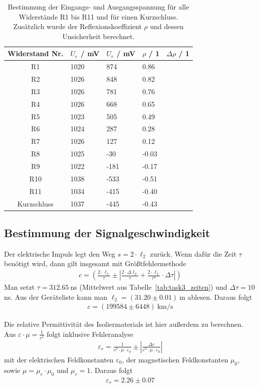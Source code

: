 \documentclass{article}
\begin{document}
\begin{table}[H]
\centering
\caption{Bestimmung der Eingangs- und Ausgangsspannung für alle Widerstände R1 bis R11 und für einen Kurzschluss. Zusätzlich wurde der Reflexionskoeffizient $\rho$ und dessen Unsicherheit berechnet.}
\label{tab:reflexionskoeff}
\begin{tabular}{c|llll}
Widerstand Nr. & $U_e$ / mV & $U_r$ / mV & $\rho$ / 1 & $\Delta \rho$ / 1 \\
\hline
R1 & 1020 & 874 & 0.86 & \\
R2 & 1026 & 848 & 0.82 & \\
R3 & 1026 & 781 & 0.76 & \\
R4 & 1026 & 668 & 0.65 & \\
R5 & 1023 & 505 & 0.49 & \\
R6 & 1024 & 287 & 0.28 & \\
R7 & 1026 & 127 & 0.12 & \\
R8 & 1025 & -30 & -0.03 & \\
R9 & 1022 & -181 & -0.17 & \\
R10 & 1038 & -533 & -0.51 & \\
R11 & 1034 & -415 & -0.40 & \\
Kurzschluss & 1037 & -445 & -0.43 & 
\end{tabular}
\end{table}




\subsection{Bestimmung der Signalgeschwindigkeit}

Der elektrische Impuls legt den Weg $s = 2\cdot \ell_2$ zurück. Wenn dafür die Zeit $\tau$ benötigt wird, dann gilt insgesamt mit Größtfehlermethode
\begin{align*}
c = \left(\frac{2\cdot \ell_2}{\tau} \pm \left|\frac{2\cdot \Delta \ell_2}{\tau} + \frac{2\cdot \ell_2}{\tau^2}\cdot \Delta \tau\right|\right)
\end{align*}
Man setzt $\tau = 312.65~$ns (Mittelwert aus Tabelle~\ref{tab:task3_zeiten}) und $\Delta \tau = 10~$ns. Aus der Geräteliste kann man $\ell_2 = (31.20 \pm 0.01)~$m ablesen. Daraus folgt
\begin{align*}
c = \left(199584 \pm  6448\right)~\text{km/s}
\end{align*}

Die relative Permittivität des Isoliermaterials ist hier außerdem zu berechnen. Aus $\varepsilon \cdot \mu = \frac{1}{c^2}$ folgt inklusive Fehleranalyse
\begin{align*}
\varepsilon_r = \frac{1}{c^2\cdot \mu\cdot \varepsilon_0} \pm \left| \frac{\Delta c}{c^3\cdot \mu\cdot \varepsilon_0} \right|
\end{align*}
mit der elektrischen Feldkonstanten $\varepsilon_0$, der magnetischen Feldkonstanten $\mu_0$, sowie $\mu = \mu_r\cdot\mu_0$ und $\mu_r=1$. Daraus folgt
\begin{align*}
\varepsilon_r = 2.26 \pm 0.07
\end{align*}
\end{document}
